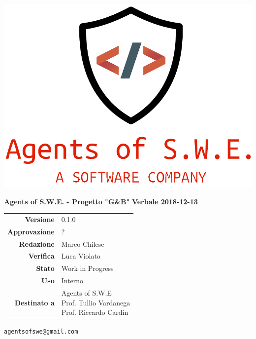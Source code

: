 


\begin{titlepage}
\thispagestyle{empty}

\begin{center}

\includegraphics[scale=0.3]{./images/logo.png} 




\large \textbf{Agents of S.W.E. - Progetto "G\&B"}
\vfill
\Huge \textbf{Verbale 2018-12-13}
\vfill
\large
\renewcommand{\arraystretch}{1.3}
\begin{tabular}{r|l}
\textbf{Versione} & 0.1.0\\
\textbf{Approvazione} & ?\\
\textbf{Redazione} & \parbox[t]{5cm}{Marco Chilese}\\
\textbf{Verifica} & \parbox[t]{5cm}{Luca Violato}\\
\textbf{Stato} & Work in Progress\\
\textbf{Uso} & Interno\\
\textbf{Destinato a} & \parbox[t]{5cm}{Agents of S.W.E \\Prof. Tullio Vardanega\\Prof. Riccardo Cardin}
\end{tabular}
\vfill
\small
\texttt{agentsofswe@gmail.com}
\end{center}
\end{titlepage}

\pagebreak




\pagebreak









